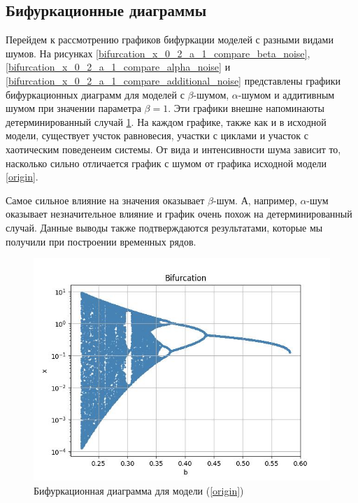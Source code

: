 \subsection{Бифуркационные диаграммы}

    Перейдем к рассмотрению графиков бифуркации моделей с разными видами шумов. На рисунках \ref{bifurcation_x_0_2_a_1_compare_beta_noise}, \ref{bifurcation_x_0_2_a_1_compare_alpha_noise} и \ref{bifurcation_x_0_2_a_1_compare_additional_noise} представлены графики бифуркационных диаграмм для моделей с \(\beta\)-шумом, \(\alpha\)-шумом и аддитивным шумом при значении параметра \(\beta = 1\). Эти графики внешне напоминаюты детерминированный случай \ref{bifurcation_x_0_2_a_1_compare_no_noise}. На каждом графике, также как и в исходной модели, существует учсток равновесия, участки с циклами и участок с хаотическим поведенеим системы. От вида и интенсивности шума зависит то, насколько сильно отличается график с шумом от графика исходной модели \ref{origin}. 

    Самое сильное влияние на значения оказывает \(\beta\)-шум. А, например, \(\alpha\)-шум оказывает незначительное влияние и график очень похож на детерминированный случай. Данные выводы также подтверждаются результатами, которые мы получили при построении временных рядов.



    \begin{figure}
        \centering
        \includegraphics[width=\textwidth]{stochastic/images/bifurcation_x_0_2_a_1_compare_no_noise.jpg}
        
        \captionsetup{justification=centering}
        \caption{Бифуркационная диаграмма для модели (\ref{origin})}
        \label{bifurcation_x_0_2_a_1_compare_no_noise}
    \end{figure}


